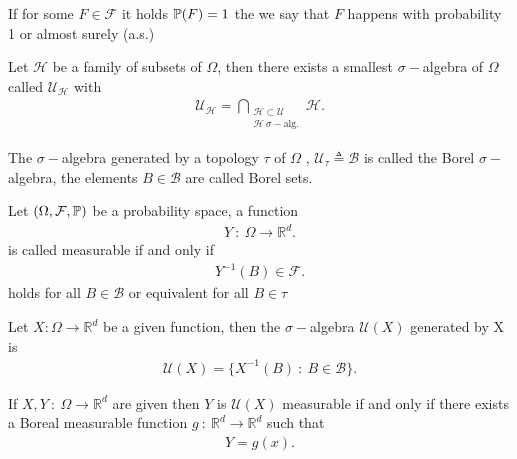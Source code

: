 \begin{definition}
  If for some $F \in  \mathcal{F}$ it holds $\P(F) = 1$ the we say that $F$ happens with 
  probability 1 or almost surely (a.s.)
\end{definition}
\begin{remark}
 Let $\mathcal{H}$  be a family of subsets of $\Omega$, then there exists a smallest $\sigma-$algebra of 
 $\Omega$ called $\mathcal{U}_{\mathcal{H}}$ with 
 \begin{align*}
   \mathcal{U}_{\mathcal{H}} = \bigcap_{\substack{\mathcal{H} \subset \mathcal{U} \\ \mathcal{H} \ \sigma-\text{alg.}}} \mathcal{H}  
 .\end{align*}
\end{remark}
\begin{example}
  The $\sigma-$algebra generated by a topology $\tau $ of $\Omega$ , $\mathcal{U}_{\tau } \triangleq \mathcal{B}$ is called 
  the Borel $\sigma-$algebra, the elements $B \in  \mathcal{B}$ are called Borel sets.
\end{example}
\begin{definition}
 Let $(\Omega ,\mathcal{F},\P)$  be a probability space, a function 
 \begin{align*}
  Y \ : \ \Omega  \to \mathbb{R}^{d} 
 .\end{align*}
 is called measurable if and only if 
 \begin{align*}
  Y^{-1}(B) \in  \mathcal{F} 
 .\end{align*}
 holds for all $B \in  \mathcal{B}$ or equivalent for all $B \in  \tau $
\end{definition}
\begin{example}
 Let $X : \Omega  \to  \mathbb{R}^{d} $  be a given function, then the $\sigma-$algebra $\mathcal{U}(X)$ generated by X is 
 \begin{align*}
  \mathcal{U}(X) = \{X^{-1}(B) \ : \ B \in  \mathcal{B} \}  
 .\end{align*}
\end{example}
\begin{lemma}
 If $X,Y \ : \ \Omega  \to \mathbb{R}^{d} $  are given then $Y$ is $\mathcal{U}(X)$ measurable if and only if 
 there exists a Boreal measurable function $g \ : \ \mathbb{R}^{d} \to  \mathbb{R}^{d}  $ such that 
 \begin{align*}
  Y = g(x)
 .\end{align*}
\end{lemma}
